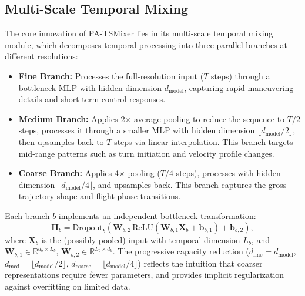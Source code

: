\documentclass[letterpaper,journal]{IEEEtran}
\begin{document}
\subsection{Multi-Scale Temporal Mixing}
The core innovation of PA-TSMixer lies in its multi-scale temporal mixing module,
which decomposes temporal processing into three parallel branches at different resolutions:

\begin{itemize}
\item \textbf{Fine Branch:} Processes the full-resolution input ($T$ steps) through a
bottleneck MLP with hidden dimension $d_{\text{model}}$, capturing rapid maneuvering
details and short-term control responses.
\item \textbf{Medium Branch:} Applies 2$\times$ average pooling to reduce the sequence
to $T/2$ steps, processes it through a smaller MLP with hidden dimension
$\lfloor d_{\text{model}}/2 \rfloor$, then upsamples back to $T$ steps via linear
interpolation. This branch targets mid-range patterns such as turn initiation and
velocity profile changes.
\item \textbf{Coarse Branch:} Applies 4$\times$ pooling ($T/4$ steps), processes with
hidden dimension $\lfloor d_{\text{model}}/4 \rfloor$, and upsamples back. This branch
captures the gross trajectory shape and flight phase transitions.
\end{itemize}

Each branch $b$ implements an independent bottleneck transformation:
\begin{equation}
\mathbf{H}_b = \text{Dropout}_b\left(\mathbf{W}_{b,2}\,\text{ReLU}\left(\mathbf{W}_{b,1} \mathbf{X}_b + \mathbf{b}_{b,1}\right) + \mathbf{b}_{b,2}\right),
\end{equation}
where $\mathbf{X}_b$ is the (possibly pooled) input with temporal dimension $L_b$,
and $\mathbf{W}_{b,1} \in \mathbb{R}^{d_b \times L_b}$, $\mathbf{W}_{b,2} \in \mathbb{R}^{L_b \times d_b}$.
The progressive capacity reduction ($d_{\text{fine}} = d_{\text{model}}$,
$d_{\text{med}} = \lfloor d_{\text{model}}/2 \rfloor$, $d_{\text{coarse}} = \lfloor d_{\text{model}}/4 \rfloor$)
reflects the intuition that coarser representations require fewer parameters, and
provides implicit regularization against overfitting on limited data.
\end{document}
